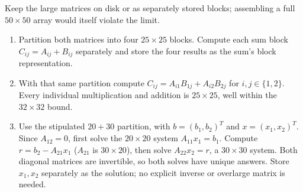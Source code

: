 Keep the large matrices on disk or as separately stored blocks;
assembling a full $50\times50$ array would itself violate the limit.
\begin{enumerate}[label=(\alph*)]
\item Partition both matrices into four $25\times25$ blocks.
Compute each sum block $C_{ij}=A_{ij}+B_{ij}$ separately and
store the four results as the sum's block representation.
\item With that same partition compute
$C_{ij}=A_{i1}B_{1j}+A_{i2}B_{2j}$ for $i,j\in\{1,2\}$.
Every individual multiplication and addition is $25\times25$,
well within the $32\times32$ bound.
\item Use the stipulated $20+30$ partition, with
$b=(b_1,b_2)^T$ and $x=(x_1,x_2)^T$. Since $A_{12}=0$,
first solve the $20\times20$ system $A_{11}x_1=b_1$.
Compute $r=b_2-A_{21}x_1$ ($A_{21}$ is $30\times20$), then
solve $A_{22}x_2=r$, a $30\times30$ system. Both diagonal
matrices are invertible, so both solves have unique answers.
Store $x_1,x_2$ separately as the solution; no explicit inverse
or overlarge matrix is needed.
\end{enumerate}
